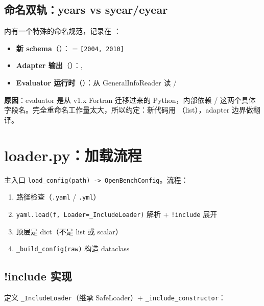 \subsection{命名双轨：years vs syear/eyear}

\openbench{} 内有一个特殊的命名规范，记录在 ：

\begin{itemize}
  \item \textbf{新 schema}（）： = \texttt{[2004, 2010]}
  \item \textbf{Adapter 输出}（）：, 
  \item \textbf{Evaluator 运行时}（）：从 GeneralInfoReader 读 /
\end{itemize}

\textbf{原因}：evaluator 是从 v1.x Fortran 迁移过来的 Python，内部依赖 / 这两个具体字段名。完全重命名工作量太大，所以约定：新代码用 （list），adapter 边界做翻译。


\section{loader.py：加载流程}

 主入口 \texttt{load\_config(path) -> OpenBenchConfig}。流程：

\begin{enumerate}
  \item 路径检查（\texttt{.yaml} / \texttt{.yml}）
  \item \texttt{yaml.load(f, Loader=\_IncludeLoader)} 解析 + \texttt{!include} 展开
  \item 顶层是 dict（不是 list 或 scalar）
  \item \texttt{\_build\_config(raw)} 构造 dataclass
\end{enumerate}

\subsection{!include 实现}

 定义 \texttt{\_IncludeLoader}（继承 SafeLoader）+ \texttt{\_include\_constructor}：

